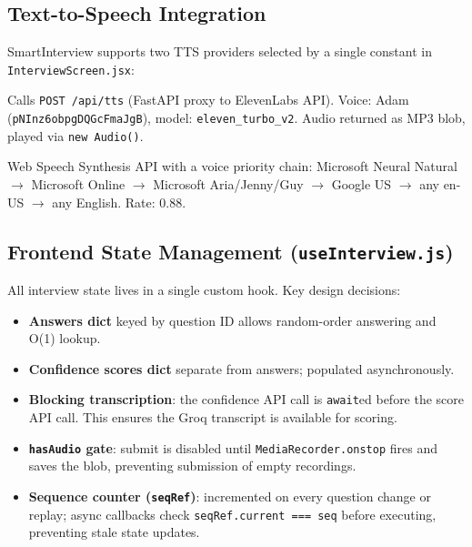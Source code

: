 \documentclass[12pt,a4paper]{article}
\begin{document}
\subsection{Text-to-Speech Integration}

SmartInterview supports two TTS providers selected by a single constant in \texttt{InterviewScreen.jsx}:

\begin{description}[leftmargin=2em]
  \item[\texttt{TTS\_PROVIDER = "elevenlabs"}] Calls \texttt{POST /api/tts} (FastAPI proxy to ElevenLabs API). Voice: Adam (\texttt{pNInz6obpgDQGcFmaJgB}), model: \texttt{eleven\_turbo\_v2}. Audio returned as MP3 blob, played via \texttt{new Audio()}.
  \item[\texttt{TTS\_PROVIDER = "browser"}] Web Speech Synthesis API with a voice priority chain: Microsoft Neural Natural $\rightarrow$ Microsoft Online $\rightarrow$ Microsoft Aria/Jenny/Guy $\rightarrow$ Google US $\rightarrow$ any en-US $\rightarrow$ any English. Rate: 0.88.
\end{description}

\subsection{Frontend State Management (\texttt{useInterview.js})}

All interview state lives in a single custom hook. Key design decisions:

\begin{itemize}[leftmargin=1.5em]
  \item \textbf{Answers dict} keyed by question ID allows random-order answering and O(1) lookup.
  \item \textbf{Confidence scores dict} separate from answers; populated asynchronously.
  \item \textbf{Blocking transcription}: the confidence API call is \texttt{await}ed before the score API call. This ensures the Groq transcript is available for scoring.
  \item \textbf{\texttt{hasAudio} gate}: submit is disabled until \texttt{MediaRecorder.onstop} fires and saves the blob, preventing submission of empty recordings.
  \item \textbf{Sequence counter (\texttt{seqRef})}: incremented on every question change or replay; async callbacks check \texttt{seqRef.current === seq} before executing, preventing stale state updates.
\end{itemize}
\end{document}
